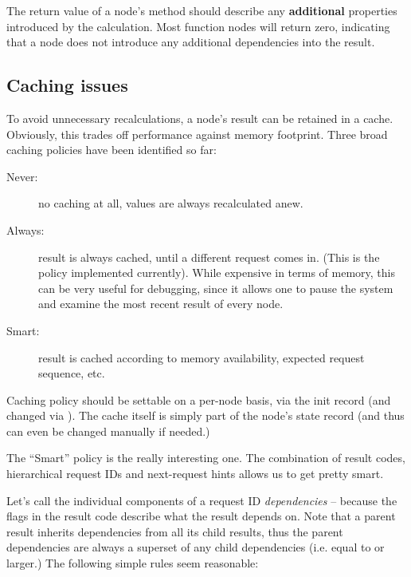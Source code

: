 \documentclass[10pt]{article}
\begin{document}
  The return value of a node's  method should describe any {\bf
  additional} properties introduced by the  calculation.
  Most function nodes will
  return zero, indicating that a node does not introduce any additional
  dependencies into the result. 
  
\subsection{Caching issues}

  To avoid unnecessary recalculations, a node's result can be retained in a
  cache. Obviously, this trades off performance against memory footprint. Three
  broad caching policies have been identified so far:

  \begin{description}
  
  \item[Never:] no caching at all, values are always recalculated anew. 
   
  \item[Always:] result is always cached, until a different request comes in.
    (This is the policy implemented currently). While expensive in terms of
    memory, this can be very useful for debugging, since it allows one to pause
    the system and examine the most recent result of every node.

  \item[Smart:] result is cached according to memory availability, expected
    request sequence, etc.

  \end{description}
  
  Caching policy should be settable on a per-node basis, via the init record
  (and changed via ). The cache itself is simply part of the
  node's state record (and thus can even be changed manually if needed.)
  
  The ``Smart'' policy is the really interesting one. The combination of result
  codes, hierarchical request IDs and next-request hints allows us to get
  pretty smart. 
  
  Let's call the individual components of a request ID {\em dependencies} --
  because the  flags in the result code describe what the result
  depends on. Note that a parent result inherits dependencies from all its
  child results, thus the parent dependencies are always a superset of any
  child dependencies (i.e. equal to or larger.) The following simple rules seem
  reasonable:
\end{document}
